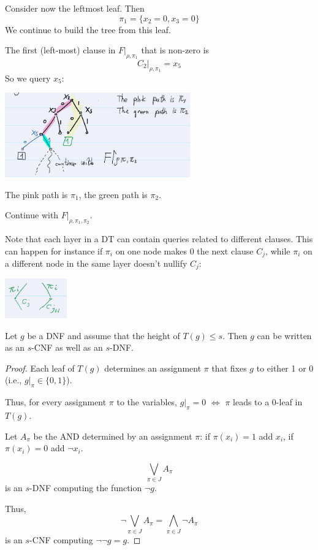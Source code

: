 Consider now the leftmost leaf. Then
\[
\pi_1 = \{ x_2 = 0, x_3 = 0 \}
\]
We continue to build the tree from this leaf.

\noindent
The first (left-most) clause in \( F|_{\rho, \pi_1} \) that is non-zero is
\[
C_2|_{\rho, \pi_1} = x_5
\]
So we query \( x_5 \):

\noindent
\includegraphics[width=0.6\textwidth]{images/ex4-sl-dt.png}
\noindent

The pink path is \( \pi_1 \), the green path is \( \pi_2 \).

\noindent
Continue with \( F|_{\rho, \pi_1, \pi_2} \).

\noindent
Note that each layer in a DT can contain queries related to different clauses.
This can happen for instance if \( \pi_i \) on one node makes 0 the next clause \( C_j \), 
while \( \pi_i \) on a different node in the same layer doesn't nullify \( C_j \):
 
\includegraphics[width=0.2\textwidth]{images/ex5-sl-dt.png}
\begin{claim}
Let \( g \) be a DNF and assume that the height of \( T(g) \leq s \).
Then \( g \) can be written as an \( s \)-CNF as well as an \( s \)-DNF.
\end{claim}

\begin{proof}
Each leaf of \( T(g) \) determines an assignment \( \pi \) that fixes \( g \) to either 1 or 0 
(i.e., \( g|_{\pi} \in \{0,1\} \)).

Thus, for every assignment \( \pi \) to the variables, \( g|_{\pi} = 0 \) \( \Leftrightarrow \) 
\( \pi \) leads to a 0-leaf in \( T(g) \).

Let \( A_{\pi} \) be the AND determined by an assignment \( \pi \):
if \( \pi(x_i) = 1 \) add \( x_i \), if \( \pi(x_i) = 0 \) add \( \neg x_i \).

\[
\bigvee_{ \pi \in J } A_{\pi}
\]
is an \( s \)-DNF computing the function \( \neg g \).

Thus, 
\[
\neg \bigvee_{\pi \in J} A_{\pi} = \bigwedge_{\pi \in J} \neg A_{\pi}
\]
is an \( s \)-CNF computing \( \neg \neg g = g \).


\end{proof}

